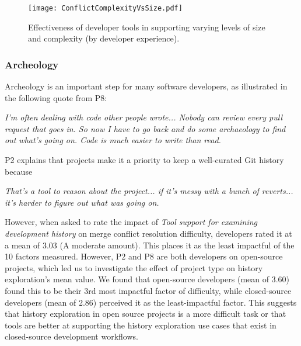 \begin{figure*}[!t]
\centering
\texttt{[image: ConflictComplexityVsSize.pdf]}
\caption{Effectiveness of developer tools in supporting varying levels of size and complexity (by developer experience).}
\label{size_vs_complexity}
\end{figure*}

\subsubsection{Archeology}
Archeology is an important step for many software developers, as illustrated in the following quote from P8:
\begin{displayquote}
\textit{I'm often dealing with code other people wrote... Nobody can review every pull request that goes in. So now I have to go back and do some archaeology to find out what's going on. Code is much easier to write than read.}
\end{displayquote}
P2 explains that projects make it a priority to keep a well-curated Git history because
\begin{displayquote}
\textit{That's a tool to reason about the project... if it's messy with a bunch of reverts... it's harder to figure out what was going on.	}
\end{displayquote}


However, when asked to rate the impact of \textit{Tool support for examining development history} on merge conflict resolution difficulty, developers rated it at a mean of 3.03 (A moderate amount). This places it as the least impactful of the 10 factors measured. However, P2 and P8 are both developers on open-source projects, which led us to investigate the effect of project type on history exploration's mean value. We found that open-source developers (mean of 3.60) found this to be their 3rd most impactful factor of difficulty, while closed-source developers (mean of 2.86) perceived it as the least-impactful factor. This suggests that history exploration in open source projects is a more difficult task or that tools are better at supporting the history exploration use cases that exist in closed-source development workflows.

